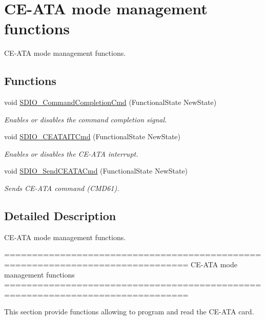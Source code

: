 \hypertarget{group___s_d_i_o___group5}{\section{C\-E-\/\-A\-T\-A mode management functions}
\label{group___s_d_i_o___group5}
}


C\-E-\/\-A\-T\-A mode management functions.  


\subsection*{Functions}
\begin{DoxyCompactItemize}
\item 
void \hyperlink{group___s_d_i_o___group5_ga1bbe98c629812bc62121d9c8b2c5e21b}{S\-D\-I\-O\-\_\-\-Command\-Completion\-Cmd} (Functional\-State New\-State)
\begin{DoxyCompactList}\small\item\em Enables or disables the command completion signal. \end{DoxyCompactList}\item 
void \hyperlink{group___s_d_i_o___group5_gab44b8cbc21be000a291563076159503b}{S\-D\-I\-O\-\_\-\-C\-E\-A\-T\-A\-I\-T\-Cmd} (Functional\-State New\-State)
\begin{DoxyCompactList}\small\item\em Enables or disables the C\-E-\/\-A\-T\-A interrupt. \end{DoxyCompactList}\item 
void \hyperlink{group___s_d_i_o___group5_ga8dc7f17804bdb745b42f6647c8487b4c}{S\-D\-I\-O\-\_\-\-Send\-C\-E\-A\-T\-A\-Cmd} (Functional\-State New\-State)
\begin{DoxyCompactList}\small\item\em Sends C\-E-\/\-A\-T\-A command (C\-M\-D61). \end{DoxyCompactList}\end{DoxyCompactItemize}


\subsection{Detailed Description}
C\-E-\/\-A\-T\-A mode management functions. \begin{DoxyVerb} ===============================================================================
              CE-ATA mode management functions
 ===============================================================================  

  This section provide functions allowing to program and read the CE-ATA card.\end{DoxyVerb}
 

